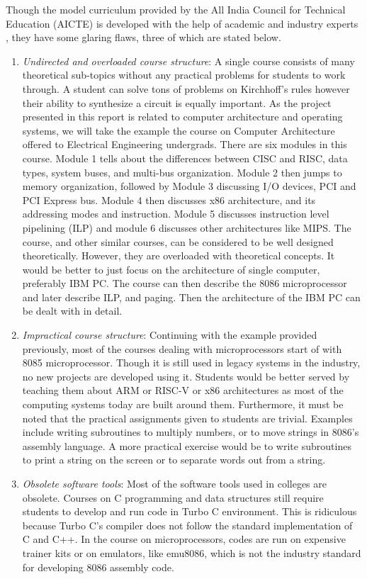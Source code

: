 Though the model curriculum provided by the All India Council for Technical Education (AICTE) is developed with the help of academic and industry experts \cite{basu2018model}, they have some glaring flaws, three of which are stated below.
\begin{enumerate}
	\item \textit{Undirected and overloaded course structure}: A single course consists of many theoretical sub-topics without any practical problems for students to work through. A student can solve tons of problems on Kirchhoff's rules however their ability to synthesize a circuit is equally important. As the project presented in this report is related to computer architecture and operating systems, we will take the example the course on Computer Architecture offered to Electrical Engineering undergrads. There are six modules in this course. Module 1 tells about the differences between CISC and RISC, data types, system buses, and multi-bus organization. Module 2 then jumps to memory organization, followed by Module 3 discussing I/O devices, PCI and PCI Express bus. Module 4 then discusses x86 architecture, and its addressing modes and instruction. Module 5 discusses instruction level pipelining (ILP) and module 6 discusses other architectures like MIPS. The course, and other similar courses, can be considered to be well designed theoretically. However, they are overloaded with theoretical concepts. It would be better to just focus on the architecture of single computer, preferably IBM PC. The course can then describe the 8086 microprocessor and later describe ILP, and paging. Then the architecture of the IBM PC can be dealt with in detail.
	\item \textit{Impractical course structure}: Continuing with the example provided previously, most of the courses dealing with microprocessors start of with 8085 microprocessor. Though it is still used in legacy systems in the industry, no new projects are developed using it. Students would be better served by teaching them about ARM or RISC-V or x86 architectures as most of the computing systems today are built around them. Furthermore, it must be noted that the practical assignments given to students are trivial. Examples include writing subroutines to multiply numbers, or to move strings in 8086's assembly language. A more practical exercise would be to write subroutines to print a string on the screen or to separate words out from a string.   
	\item \textit{Obsolete software tools}: Most of the software tools used in colleges are obsolete. Courses on C programming and data structures still require students to develop and run code in Turbo C environment. This is ridiculous because Turbo C's compiler does not follow the standard implementation of C and C++. In the course on microprocessors, codes are run on expensive trainer kits or on emulators, like emu8086, which is not the industry standard for developing 8086 assembly code.
\end{enumerate}

